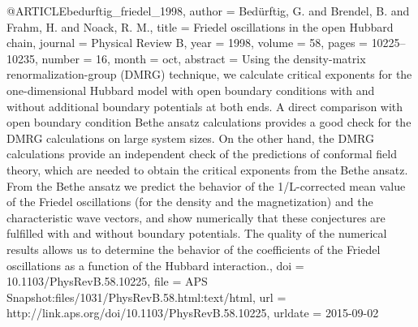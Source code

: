 @ARTICLE{bedurftig_friedel_1998,
  author = {Bed{\"u}rftig, G. and Brendel, B. and Frahm, H. and Noack, R. M.},
  title = {Friedel oscillations in the open {Hubbard} chain},
  journal = {Physical Review B},
  year = {1998},
  volume = {58},
  pages = {10225--10235},
  number = {16},
  month = oct,
  abstract = {Using the density-matrix renormalization-group (DMRG) technique, we
	calculate critical exponents for the one-dimensional Hubbard model
	with open boundary conditions with and without additional boundary
	potentials at both ends. A direct comparison with open boundary condition
	Bethe ansatz calculations provides a good check for the DMRG calculations
	on large system sizes. On the other hand, the DMRG calculations provide
	an independent check of the predictions of conformal field theory,
	which are needed to obtain the critical exponents from the Bethe
	ansatz. From the Bethe ansatz we predict the behavior of the 1/L-corrected
	mean value of the Friedel oscillations (for the density and the magnetization)
	and the characteristic wave vectors, and show numerically that these
	conjectures are fulfilled with and without boundary potentials. The
	quality of the numerical results allows us to determine the behavior
	of the coefficients of the Friedel oscillations as a function of
	the Hubbard interaction.},
  doi = {10.1103/PhysRevB.58.10225},
  file = {APS Snapshot:files/1031/PhysRevB.58.html:text/html},
  url = {http://link.aps.org/doi/10.1103/PhysRevB.58.10225},
  urldate = {2015-09-02}
}

